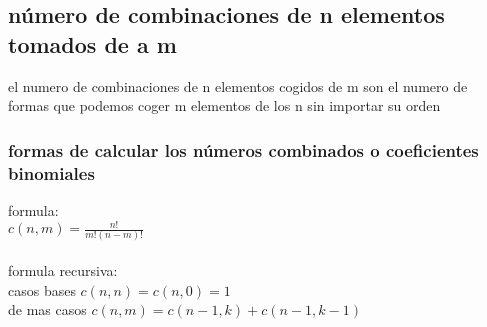 \subsection{número de combinaciones de n elementos tomados de a m}
el numero de combinaciones de n elementos cogidos de m son el numero de formas que podemos coger m elementos de los n sin importar su orden\\
\subsubsection{formas de calcular los números combinados o coeficientes binomiales}
formula:\\
$c(n,m)=\frac{n!}{m!(n-m)!}$\\
\\
formula recursiva:\\
casos bases $c(n,n)=c(n,0)=1$\\
de mas casos $c(n,m)=c(n-1,k)+c(n-1,k-1)$
